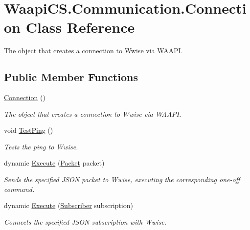 \hypertarget{class_waapi_c_s_1_1_communication_1_1_connection}{}\section{Waapi\+C\+S.\+Communication.\+Connection Class Reference}
\label{class_waapi_c_s_1_1_communication_1_1_connection}


The object that creates a connection to Wwise via W\+A\+A\+PI.  


\subsection*{Public Member Functions}
\begin{DoxyCompactItemize}
\item 
\mbox{\hyperlink{class_waapi_c_s_1_1_communication_1_1_connection_a532a29f220d9ff5a79562693a87326b3}{Connection}} ()
\begin{DoxyCompactList}\small\item\em The object that creates a connection to Wwise via W\+A\+A\+PI. \end{DoxyCompactList}\item 
void \mbox{\hyperlink{class_waapi_c_s_1_1_communication_1_1_connection_a96ee59b454b0721752d4520a0aa49515}{Test\+Ping}} ()
\begin{DoxyCompactList}\small\item\em Tests the ping to Wwise. \end{DoxyCompactList}\item 
dynamic \mbox{\hyperlink{class_waapi_c_s_1_1_communication_1_1_connection_a14ecc5c888dded234beb95f975e1d708}{Execute}} (\mbox{\hyperlink{class_waapi_c_s_1_1_communication_1_1_packet}{Packet}} packet)
\begin{DoxyCompactList}\small\item\em Sends the specified J\+S\+ON packet to Wwise, executing the corresponding one-\/off command. \end{DoxyCompactList}\item 
dynamic \mbox{\hyperlink{class_waapi_c_s_1_1_communication_1_1_connection_a7b579e64444614a48bdfb6b492e4efc0}{Execute}} (\mbox{\hyperlink{class_waapi_c_s_1_1_communication_1_1_subscriber}{Subscriber}} subscription)
\begin{DoxyCompactList}\small\item\em Connects the specified J\+S\+ON subscription with Wwise. \end{DoxyCompactList}\end{DoxyCompactItemize}
